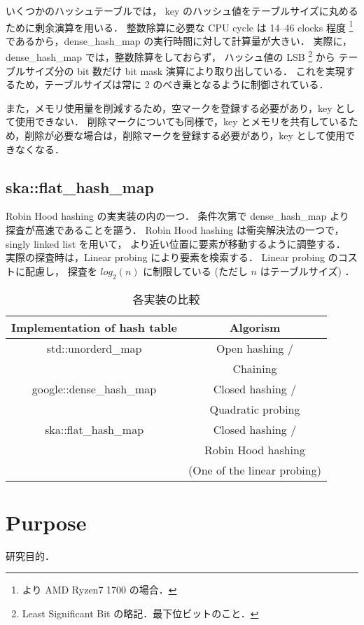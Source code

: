 いくつかのハッシュテーブルでは，
key のハッシュ値をテーブルサイズに丸めるために剰余演算を用いる．
整数除算に必要な CPU cycle は 14--46 clocks 程度
\footnote{
  \cite{AgnerFog2018}より AMD Ryzen7 1700 の場合．
}
であるから，dense\_hash\_map の実行時間に対して計算量が大きい．
実際に，
dense\_hash\_map では，整数除算をしておらず，
ハッシュ値の LSB \footnote{Least Significant Bit の略記．最下位ビットのこと．} から
テーブルサイズ分の bit 数だけ bit mask 演算により取り出している．
これを実現するため，テーブルサイズは常に 2 のべき乗となるように制御されている．

また，メモリ使用量を削減するため，空マークを登録する必要があり，key として使用できない．
削除マークについても同様で，key とメモリを共有しているため，削除が必要な場合は，削除マークを登録する必要があり，key として使用できなくなる．

\subsection{ska::flat\_hash\_map}

Robin Hood hashing の実実装の内の一つ．
条件次第で dense\_hash\_map より探査が高速であることを謳う．
Robin Hood hashing は衝突解決法の一つで，
singly linked list を用いて，
より近い位置に要素が移動するように調整する．
実際の探査時は，Linear probing により要素を検索する．
Linear probing のコストに配慮し，
探査を $log_2(n)$ に制限している (ただし $n$ はテーブルサイズ) \cite{Skarupke2017}．


\begin{table}[hbtp]
  \begin{center}
    \caption{各実装の比較}
    \begin{tabular}{cc} \hline
      Implementation of hash table & Algorism \rule[0pt]{0pt}{0pt} \\ \hline
      std::unorderd\_map & Open hashing / \rule[0pt]{0pt}{0pt} \\ 
                         & Chaining \rule[0pt]{0pt}{0pt} \\ 
      google::dense\_hash\_map & Closed hashing / \\
                               & Quadratic probing \\
      ska::flat\_hash\_map & Closed hashing / \\
                           & Robin Hood hashing \\
                           & (One of the linear probing) \\ \hline
    \end{tabular}
  \end{center}
  \label{table_env}
\end{table}



\section{Purpose}
研究目的．



















